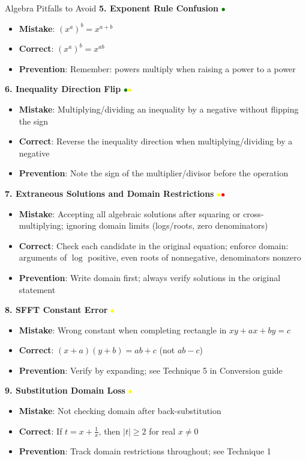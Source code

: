 \documentclass{article}
\begin{document}
\begin{trapbox}{Algebra Pitfalls to Avoid}
\textbf{5. Exponent Rule Confusion} \textcolor{green}{$\bullet$}
\begin{itemize}[nosep]
\item \textbf{Mistake}: $(x^a)^b = x^{a+b}$
\item \textbf{Correct}: $(x^a)^b = x^{ab}$
\item \textbf{Prevention}: Remember: powers multiply when raising a power to a power
\end{itemize}
\textbf{6. Inequality Direction Flip} \textcolor{green}{$\bullet$}\textcolor{yellow}{$\bullet$}
\begin{itemize}[nosep]
\item \textbf{Mistake}: Multiplying/dividing an inequality by a negative without flipping the sign
\item \textbf{Correct}: Reverse the inequality direction when multiplying/dividing by a negative
\item \textbf{Prevention}: Note the sign of the multiplier/divisor before the operation
\end{itemize}
\textbf{7. Extraneous Solutions and Domain Restrictions} \textcolor{yellow}{$\bullet$}\textcolor{red}{$\bullet$}
\begin{itemize}[nosep]
\item \textbf{Mistake}: Accepting all algebraic solutions after squaring or cross-multiplying; ignoring domain limits (logs/roots, zero denominators)
\item \textbf{Correct}: Check each candidate in the original equation; enforce domain: arguments of $\log$ positive, even roots of nonnegative, denominators nonzero
\item \textbf{Prevention}: Write domain first; always verify solutions in the original statement
\end{itemize}

\textbf{8. SFFT Constant Error} \textcolor{yellow}{$\bullet$}
\begin{itemize}[nosep]
\item \textbf{Mistake}: Wrong constant when completing rectangle in $xy + ax + by = c$
\item \textbf{Correct}: $(x+a)(y+b) = ab + c$ (not $ab - c$)
\item \textbf{Prevention}: Verify by expanding; see Technique 5 in Conversion guide
\end{itemize}

\textbf{9. Substitution Domain Loss} \textcolor{yellow}{$\bullet$}
\begin{itemize}[nosep]
\item \textbf{Mistake}: Not checking domain after back-substitution
\item \textbf{Correct}: If $t = x + \frac{1}{x}$, then $|t| \geq 2$ for real $x \neq 0$
\item \textbf{Prevention}: Track domain restrictions throughout; see Technique 1
\end{itemize}


\end{trapbox}
\end{document}
